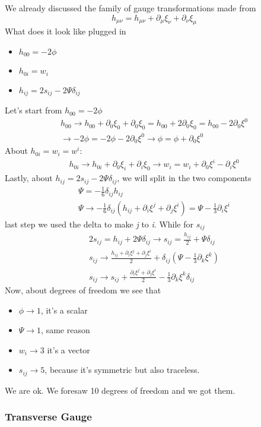 We already discussed the family of gauge transformations made from
\[
h_{\mu \nu } = h_{\mu \nu } + \partial_{\mu }\xi _{\nu }+\partial_{\nu }\xi _{\mu }
\]
What does it look like plugged in
\begin{itemize}
\item $h_{00} = -2\phi $
\item $h_{0i} = w_{i}$
\item $h_{ij} = 2s_{ij} -2\Psi \delta _{ij}$ 
\end{itemize}
Let's start from $h_{00} = -2\phi $
\begin{gather*}
h_{00} \to  h_{00}+\partial_{0}\xi _{0}+\partial_{0}\xi_{0} = h_{00} +2\partial_{0}\xi _{0} = h_{00} -2\partial_{0}\xi ^{0}\\
\to -2\phi  = -2\phi - 2\partial_{0}\xi ^{0} \to  \phi = \phi +\partial_{0}\xi ^{0}
\end{gather*}
About $h_{0i} = w_{i} = w^{i}$:
\begin{gather*}
h_{0i} \to  h_{0i} + \partial_{0}\xi _{i} + \partial_{i}\xi _{0} \to w_{i} = w_{i} +\partial_{0}\xi^{i} -\partial_{i}\xi^{0}
\end{gather*}
Lastly, about $h_{ij} = 2s_{ij}-2\Psi \delta _{ij}$, we will split in the two components
\begin{gather*}
\Psi  = -\frac{1}{6}\delta _{ij}h_{ij} \\
\Psi \to -\frac{1}{6} \delta _{ij}\left( h_{ij}+\partial_{i}\xi ^{j}+\partial_{j}\xi ^{i} \right) = \Psi -\frac{1}{3}\partial_{i}\xi ^{i}
\end{gather*}
last step we used the delta to make \emph{j} to \emph{i}. While for $s_{ij}$
\begin{gather*}
	2s_{ij} = h_{ij} +2\Psi \delta _{ij}  \to  s_{ij} = \frac{h_{ij}}{2} + \Psi \delta _{ij}\\
	s_{ij} \to \frac{h_{ij} +\partial_{i}\xi ^{j}+\partial_{j}\xi ^{i}}{2} + \delta _{ij}\left( \Psi - \frac{1}{3}\partial_{k}\xi ^{k} \right) \\
	s_{ij} \to s_{ij} + \frac{\partial_{i}\xi ^{j}+\partial_{j}\xi ^{i}}{2} -\frac{1}{3}\partial_{k}\xi ^{k}\delta _{ij} 
\end{gather*}
Now, about degrees of freedom we see that
\begin{itemize}
\item $\phi  \to  1$, it's a scalar
\item $\Psi  \to  1$, same reason
\item $w_{i} \to  3$ it's a vector
\item $s_{ij}\to 5$, because it's symmetric but also traceless.	
\end{itemize}
We are ok. We foresaw 10 degrees of freedom and we got them.

\subsubsection{Transverse Gauge}






















